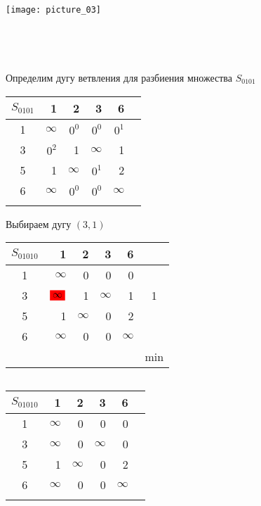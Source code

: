 \documentclass[12pt]{article}
\begin{document}
\texttt{[image: picture\_03]}\\\\\\\\\\




Определим дугу ветвления для разбиения множества $S_{0101}$\\

\begin{flushleft}
 \begin{tabular}{c||rrrr||c}
$S_{0101}$ & 1 &2 & 3  & 6 & \\
\hline
\hline
1 & $\infty$ & $0^0$ & $0^0$   & $0^1$ & \\
3 & $0^2$ & 1 & $\infty$   & 1 & \\
5 & 1 &  $\infty$ &  $0^1$ & 2 &\\
6 & $\infty$ & $0^0$ & $0^0$  & $\infty$ & \\
\hline
\hline
 & &   &  &   & \\
\end{tabular}
\end{flushleft}

Выбираем дугу $(3,1)$

\begin{flushleft}
 \begin{tabular}{c||rrrr||c}
$S_{01010}$ & 1 &2 & 3  & 6 & \\
\hline
\hline
1 & $\infty$ & 0 & 0   & 0 & \\
3 & $\colorbox{red}{$\infty$}$ & 1 & $\infty$   & 1 & 1\\
5 & 1 &  $\infty$ &  0 & 2 &\\
6 & $\infty$ & 0 & 0  & $\infty$ & \\
\hline
\hline
 & &   &  &   &min \\
\end{tabular}
$\qquad $ 
 \begin{tabular}{c||rrrr||c}
$S_{01010}$ & 1 &2 & 3  & 6 & \\
\hline
\hline
1 & $\infty$ & 0 & 0   & 0 & \\
3 & $\infty$ & 0 & $\infty$   & 0 & \\
5 & 1 &  $\infty$ &  0 & 2 &\\
6 & $\infty$ & 0 & 0  & $\infty$ & \\
\hline
\hline
 & &   &  &   & \\
\end{tabular}
\end{flushleft}
\end{document}
